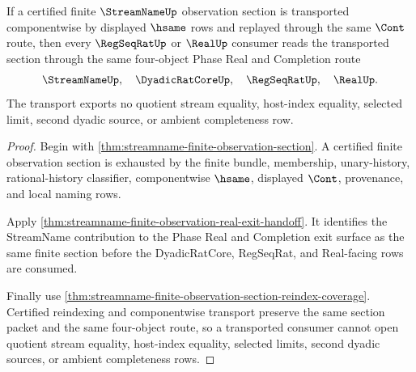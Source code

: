 \begin{theorem}
\label{thm:streamname-finite-observation-selected-transport}
If a certified finite $\StreamNameUp$ observation section is transported componentwise by displayed $\hsame$ rows and replayed through the same $\Cont$ route, then every $\RegSeqRatUp$ or $\RealUp$ consumer reads the transported section through the same four-object Phase Real and Completion route
$$
\StreamNameUp,\quad \DyadicRatCoreUp,\quad \RegSeqRatUp,\quad \RealUp .
$$
The transport exports no quotient stream equality, host-index equality, selected limit, second dyadic source, or ambient completeness row.
\end{theorem}
\begin{proof}
Begin with \autoref{thm:streamname-finite-observation-section}. A certified finite observation section is exhausted by the finite bundle, membership, unary-history, rational-history classifier, componentwise $\hsame$, displayed $\Cont$, provenance, and local naming rows.

Apply \autoref{thm:streamname-finite-observation-real-exit-handoff}. It identifies the StreamName contribution to the Phase Real and Completion exit surface as the same finite section before the DyadicRatCore, RegSeqRat, and Real-facing rows are consumed.

Finally use \autoref{thm:streamname-finite-observation-section-reindex-coverage}. Certified reindexing and componentwise transport preserve the same section packet and the same four-object route, so a transported consumer cannot open quotient stream equality, host-index equality, selected limits, second dyadic sources, or ambient completeness rows.
\end{proof}

